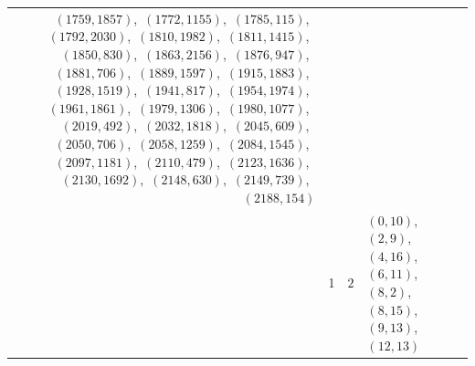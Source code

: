 \documentclass[11pt]{article}
\begin{document}
{\begin{longtable}{@{}rrl>{\raggedright\arraybackslash}p{}@{}}
$(1759,1857)$,\allowbreak\ $(1772,1155)$,\allowbreak\ $(1785,115)$,\allowbreak\ $(1792,2030)$,\allowbreak\ $(1810,1982)$,\allowbreak\ $(1811,1415)$,\allowbreak\ $(1850,830)$,\allowbreak\ $(1863,2156)$,\allowbreak\ $(1876,947)$,\allowbreak\ $(1881,706)$,\allowbreak\ $(1889,1597)$,\allowbreak\ $(1915,1883)$,\allowbreak\ $(1928,1519)$,\allowbreak\ $(1941,817)$,\allowbreak\ $(1954,1974)$,\allowbreak\ $(1961,1861)$,\allowbreak\ $(1979,1306)$,\allowbreak\ $(1980,1077)$,\allowbreak\ $(2019,492)$,\allowbreak\ $(2032,1818)$,\allowbreak\ $(2045,609)$,\allowbreak\ $(2050,706)$,\allowbreak\ $(2058,1259)$,\allowbreak\ $(2084,1545)$,\allowbreak\ $(2097,1181)$,\allowbreak\ $(2110,479)$,\allowbreak\ $(2123,1636)$,\allowbreak\ $(2130,1692)$,\allowbreak\ $(2148,630)$,\allowbreak\ $(2149,739)$,\allowbreak\ $(2188,154)$\\
\addlinespace[3pt]
19 & 1 & $2$ & $(0,10)$,\allowbreak\ $(2,9)$,\allowbreak\ $(4,16)$,\allowbreak\ $(6,11)$,\allowbreak\ $(8,2)$,\allowbreak\ $(8,15)$,\allowbreak\ $(9,13)$,\allowbreak\ $(12,13)$\\

\end{longtable}}
\end{document}
